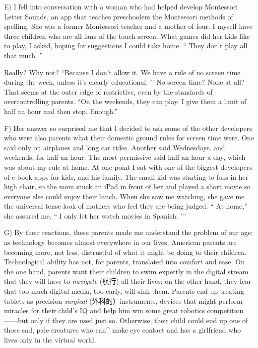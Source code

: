 \documentclass[UTF8,11pt]{ctexart}
\begin{document}
E) I fell into conversation with a woman who had helped develop Montessori Letter Sounds, an app that teaches preschoolers the Montessori methods of spelling. She was a former Montessori teacher and a mother of four. I myself have three children who are all fans of the touch screen. What games did her kids like to play, I asked, hoping for suggestions I could take home. “ They don’t play all that much. ”


Really? Why not? “Because I don’t allow it. We have a rule of no screen time during the week, unless it’s clearly educational. ’’ No screen time? None at all? That seems at the outer edge of restrictive, even by the standards of overcontrolling parents. “On the weekends, they can play. I give them a limit of half an hour and then stop. Enough.”


F) Her answer so surprised me that I decided to ask some of the other developers who were also parents what their domestic ground rules for screen time were. One said only on airplanes and long car rides. Another said Wednesdays. and weekends, for half an hour. The most permissive said half an hour a day, which was about my rule at home. At one point I sat with one of the biggest developers of e-book apps for kids, and his family. The small kid was starting to fuss in her high chair, so the mom stuck an iPad in front of her and played a short movie so everyone else could enjoy their lunch. When she saw me watching, she gave me the universal tense look of mothers who feel they are being judged. “ At home,” she assured me, “ I only let her watch movies in Spanish. ’”


G) By their reactions, these parents made me understand the problem of our age: as technology becomes almost everywhere in our lives, American parents are becoming more, not less, distrustful of what it might be doing to their children. Technological ability has not, for parents, translated into comfort and ease. On the one hand, parents want their children to swim expertly in the digital stream that they will have to\textit{ navigate} (航行) all their lives; on the other hand, they fear that too much digital media, too early, will sink them. Parents end up treating tablets as precision\textit{ surgical} (外科的）instruments, devices that might perform miracles for their child’s IQ and help him win some great robotics competition——but only if they are used just so. Otherwise, their child could end up one of those sad, pale creatures who can\textasciicircum{} make eye contact and has a girlfriend who lives only in the virtual world.
\end{document}
